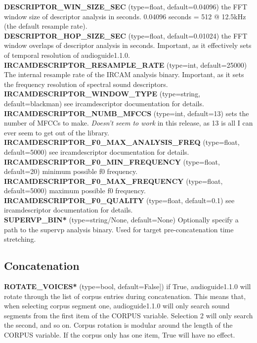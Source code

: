 \documentclass{article}
\newcommand{\optEntry}[4]{\textbf{#1} (type=#2, default=#3) #4\hspace{0.5em}\\}
\newcommand{\ag}{audioguide1.1.0\xspace}
\begin{document}
\begin{spacing}{1.2}
\optEntry{DESCRIPTOR\_WIN\_SIZE\_SEC}{float}{0.04096}{the FFT window size of descriptor analysis in seconds.  0.04096 seconds = 512 @ 12.5kHz (the default resample rate).}

\optEntry{DESCRIPTOR\_HOP\_SIZE\_SEC}{float}{0.01024}{the FFT window overlaps of descriptor analysis in seconds.  Important, as it effectively sets of temporal resolution of \ag.}

\optEntry{IRCAMDESCRIPTOR\_RESAMPLE\_RATE}{int}{25000}{The internal resample rate of the IRCAM analysis binary.  Important, as it sets the frequency resolution of spectral sound descriptors.}

\optEntry{IRCAMDESCRIPTOR\_WINDOW\_TYPE}{string}{blackman}{see ircamdescriptor documentation for details.}

\optEntry{IRCAMDESCRIPTOR\_NUMB\_MFCCS}{int}{13}{sets the number of MFCCs to make.  \emph{Doesn't seem to work} in this release, as 13 is all I can ever seem to get out of the library.}

\optEntry{IRCAMDESCRIPTOR\_F0\_MAX\_ANALYSIS\_FREQ}{float}{5000}{see ircamdescriptor documentation for details.}

\optEntry{IRCAMDESCRIPTOR\_F0\_MIN\_FREQUENCY}{float}{20}{minimum possible f0 frequency.}

\optEntry{IRCAMDESCRIPTOR\_F0\_MAX\_FREQUENCY}{float}{5000}{maximum possible f0 frequency.}

\optEntry{IRCAMDESCRIPTOR\_F0\_QUALITY}{float}{0.1}{see ircamdescriptor documentation for details.}

\optEntry{SUPERVP\_BIN*}{string/None}{None}{Optionally specify a path to the supervp analysis binary.  Used for target pre-concatenation time stretching.}



\subsection{Concatenation}
\optEntry{ROTATE\_VOICES*}{bool}{False]}{if True, \ag will rotate through the list of corpus entries during concatenation.  This means that, when selecting corpus segment one, \ag will only search sound segments from the first item of the CORPUS variable.  Selection 2 will only search the second, and so on.  Corpus rotation is modular around the length of the CORPUS variable.  If the corpus only has one item, True will have no effect.}


\end{spacing}
\end{document}
